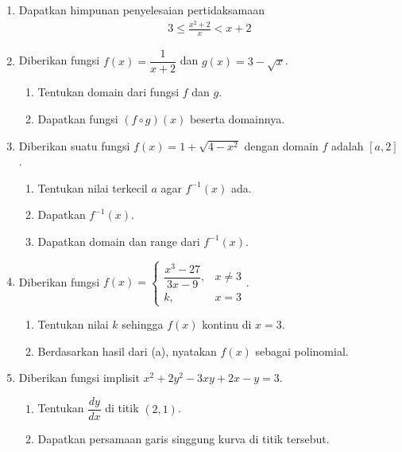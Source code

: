 \documentclass[10pt,openany,a4paper]{article}
\theoremstyle{definition}
\theoremstyle{definition}
\theoremstyle{plain}
\begin{document}
\begin{enumerate}
    \item Dapatkan himpunan penyelesaian pertidaksamaan
    \begin{align*}
        3\leq\frac{x^2+2}{x}<x+2
    \end{align*}

    \item Diberikan fungsi $f(x)=\dfrac{1}{x+2}$ dan $g(x)=3-\sqrt{x}$.
    \begin{enumerate}
        \item Tentukan domain dari fungsi $f$ dan $g$.
        \item Dapatkan fungsi $(f\circ g)(x)$ beserta domainnya.
    \end{enumerate}

    \item Diberikan suatu fungsi $f(x)=1+\sqrt{4-x^2}$ dengan domain $f$ adalah $[a,2]$.
    \begin{enumerate}
        \item Tentukan nilai terkecil $a$ agar $f^{-1}(x)$ ada.
        \item Dapatkan $f^{-1}(x)$.
        \item Dapatkan domain dan range dari $f^{-1}(x)$.
    \end{enumerate}

    \item Diberikan fungsi $f(x)=\begin{cases}
        \dfrac{x^3-27}{3x-9}, & x\neq 3\\
        k, & x=3
    \end{cases}$.
    \begin{enumerate}
        \item Tentukan nilai $k$ sehingga $f(x)$ kontinu di $x=3$.
        \item Berdasarkan hasil dari (a), nyatakan $f(x)$ sebagai polinomial.
    \end{enumerate}

    \item Diberikan fungsi implisit $x^2+2y^2-3xy+2x-y=3$.
    \begin{enumerate}
        \item Tentukan $\dfrac{dy}{dx}$ di titik $(2,1)$.
        \item Dapatkan persamaan garis singgung kurva di titik tersebut.
    \end{enumerate}
\end{enumerate}
\end{document}
